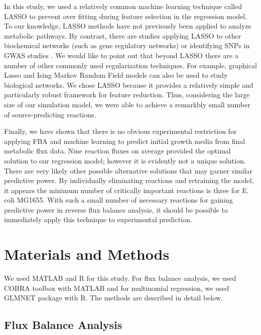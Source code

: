 \documentclass[12pt]{article}
\begin{document}
In this study, we used a relatively common machine learning technique called LASSO to prevent over fitting during feature selection in the regression model. To our knowledge, LASSO methods have not previously been applied to analyze metabolic pathways. By contrast, there are studies applying LASSO to other biochemical networks (such as gene regulatory networks) \cite{Menendezetal2010} or identifying SNPs in GWAS studies \cite{Wuetal2009}. We would like to point out that beyond LASSO there are a number of other commonly used regularization techniques. For example, graphical Lasso \cite{Friedmanetal2008} and Ising Markov Random Field models \cite{Ravikumaretal2010} can also be used to study biological networks. We chose LASSO because it provides a relatively simple and particularly robust framework for feature reduction. Thus, considering the large size of our simulation model, we were able to achieve a remarkbly small number of source-predicting reactions.

Finally, we have shown that there is no obvious experimental restriction for applying FBA and machine learning to predict initial growth media from final metabolic flux data. Nine reaction fluxes on average provided the optimal solution to our regression model; however it is evidently not a unique solution. There are very likely other possible alternative solutions that may garner similar predictive power. By individually eliminating reactions and retraining the model, it appears the minimum number of critically important reactions is three for E. coli MG1655.  With such a small number of necessary reactions for gaining predictive power in reverse flux balance analysis, it should be possible to immediately apply this technique to experimental prediction. 

\section*{Materials and Methods}
We used MATLAB and R for this study. For flux balance analysis, we used COBRA toolbox \cite{Schellenbergeretal2011} with MATLAB and for multinomial regression, we used GLMNET package \cite{Friedmanetal2010} with R. The methods are described in detail below.

\subsection*{Flux Balance Analysis} 
\end{document}
